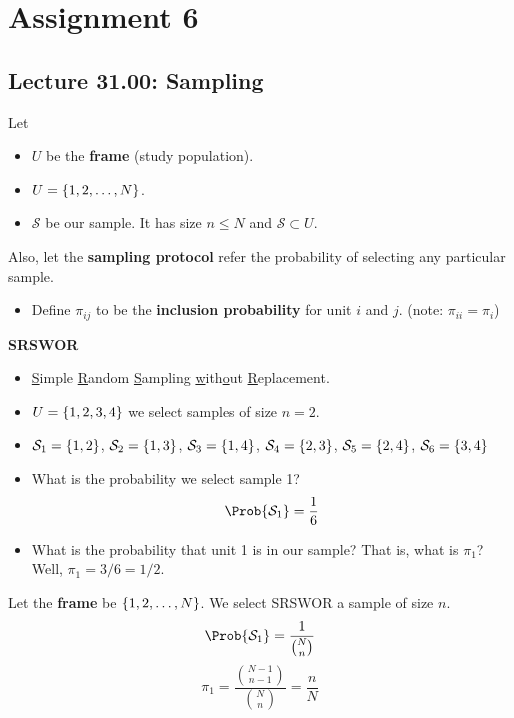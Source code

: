 \chapter{Assignment 6}
\section{Lecture 31.00: Sampling}
Let
\begin{itemize}
    \item $ U $ be the \textbf{frame} (study population).
    \item $ U=\set{1,2,\ldots,N} $.
    \item $ \mathcal{S} $ be our sample. It has size $ n\le N $
          and $ \mathcal{S}\subset U $.
\end{itemize}
Also, let the \textbf{sampling protocol} refer
the probability of selecting any particular sample.
\begin{itemize}
    \item Define $ \pi_{ij} $ to be the \textbf{inclusion probability}
          for unit $ i $ and $ j $. (note: $ \pi_{ii}=\pi_{i} $)
\end{itemize}
\textbf{SRSWOR}
\begin{itemize}
    \item \underline{S}imple \underline{R}andom \underline{S}ampling \underline{w}ith\underline{o}ut
          \underline{R}eplacement.
    \item $ U=\set{1,2,3,4} $ we select samples of size $ n=2 $.
    \item $ \mathcal{S}_1=\set{1,2} $, $ \mathcal{S}_2=\set{1,3} $,
          $ \mathcal{S}_3=\set{1,4} $, $ \mathcal{S}_4=\set{2,3} $,
          $ \mathcal{S}_5=\set{2,4} $, $ \mathcal{S}_6=\set{3,4} $
    \item What is the probability we select sample 1?
          \[ \Prob{\mathcal{S}_1}=\frac{1}{6} \]
    \item What is the probability that unit 1 is in our sample?
          That is, what is $ \pi_1$? Well, $\pi_1=3/6=1/2 $.
\end{itemize}
Let the \textbf{frame} be $ \set{1,2,\ldots,N} $.
We select SRSWOR a sample of size $ n $.
\[ \Prob{\mathcal{S}_1}=\frac{1}{\binom{N}{n}} \]
\[ \pi_1=\frac{\binom{N-1}{n-1}}{\binom{N}{n}} =\frac{n}{N} \]
